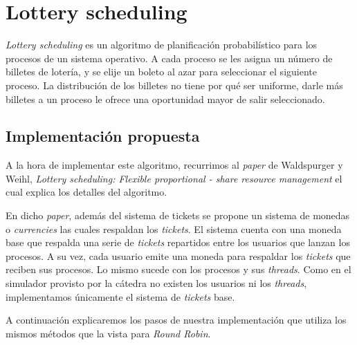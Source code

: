 \section{Lottery scheduling}
\emph{Lottery scheduling} es un algoritmo de planificación probabilístico para los procesos de un sistema operativo. A cada proceso se les asigna un número de billetes de lotería, y se elije un boleto al azar para seleccionar el siguiente proceso. La distribución de los billetes no tiene por qué ser uniforme, darle más billetes a un proceso le ofrece una oportunidad mayor de salir seleccionado.

\subsection{Implementación propuesta}
A la hora de implementar este algoritmo, recurrimos al \emph{paper} de Waldspurger y Weihl, \emph{Lottery scheduling: Flexible proportional - share resource management} el cual explica los detalles del algoritmo. 

En dicho \emph{paper}, además del sistema de tickets se propone un sistema de monedas o \emph{currencies} las cuales respaldan los \emph{tickets}. El sistema cuenta con una moneda base que respalda una serie de \emph{tickets} repartidos entre los usuarios que lanzan los procesos. A su vez, cada usuario emite una moneda para respaldar los \emph{tickets} que reciben sus procesos. Lo mismo sucede con los procesos y sus \emph{threads}. Como en el simulador provisto por la cátedra no existen los usuarios ni los \emph{threads}, implementamos únicamente el sistema de \emph{tickets} base.

A continuación explicaremos los pasos de nuestra implementación que utiliza los mismos métodos que la vista para \emph{Round Robin}.

